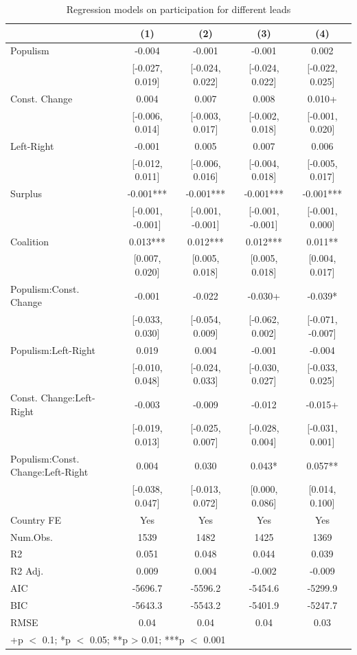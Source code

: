 \documentclass[
  abstract]{article}
\begin{document}
\hypertarget{tbl-leadpartip}{}
\begin{table}
\caption{\label{tbl-leadpartip}Regression models on participation for different leads }\tabularnewline

\centering\centering\centering
\begin{tabular}[t]{lcccc}
\toprule
  & (1) & (2) & (3) & (4)\\
\midrule
Populism & -0.004 & -0.001 & -0.001 & 0.002\\
 & {}[-0.027, 0.019] & {}[-0.024, 0.022] & {}[-0.024, 0.022] & {}[-0.022, 0.025]\\
Const. Change & 0.004 & 0.007 & 0.008 & 0.010+\\
 & {}[-0.006, 0.014] & {}[-0.003, 0.017] & {}[-0.002, 0.018] & {}[-0.001, 0.020]\\
Left-Right & -0.001 & 0.005 & 0.007 & 0.006\\
 & {}[-0.012, 0.011] & {}[-0.006, 0.016] & {}[-0.004, 0.018] & {}[-0.005, 0.017]\\
Surplus & -0.001*** & -0.001*** & -0.001*** & -0.001***\\
 & {}[-0.001, -0.001] & {}[-0.001, -0.001] & {}[-0.001, -0.001] & {}[-0.001, 0.000]\\
Coalition & 0.013*** & 0.012*** & 0.012*** & 0.011**\\
 & {}[0.007, 0.020] & {}[0.005, 0.018] & {}[0.005, 0.018] & {}[0.004, 0.017]\\
Populism:Const. Change & -0.001 & -0.022 & -0.030+ & -0.039*\\
 & {}[-0.033, 0.030] & {}[-0.054, 0.009] & {}[-0.062, 0.002] & {}[-0.071, -0.007]\\
Populism:Left-Right & 0.019 & 0.004 & -0.001 & -0.004\\
 & {}[-0.010, 0.048] & {}[-0.024, 0.033] & {}[-0.030, 0.027] & {}[-0.033, 0.025]\\
Const. Change:Left-Right & -0.003 & -0.009 & -0.012 & -0.015+\\
 & {}[-0.019, 0.013] & {}[-0.025, 0.007] & {}[-0.028, 0.004] & {}[-0.031, 0.001]\\
Populism:Const. Change:Left-Right & 0.004 & 0.030 & 0.043* & 0.057**\\
 & {}[-0.038, 0.047] & {}[-0.013, 0.072] & {}[0.000, 0.086] & {}[0.014, 0.100]\\
\midrule
Country FE & Yes & Yes & Yes & Yes\\
Num.Obs. & 1539 & 1482 & 1425 & 1369\\
R2 & 0.051 & 0.048 & 0.044 & 0.039\\
R2 Adj. & 0.009 & 0.004 & -0.002 & -0.009\\
AIC & -5696.7 & -5596.2 & -5454.6 & -5299.9\\
BIC & -5643.3 & -5543.2 & -5401.9 & -5247.7\\
RMSE & 0.04 & 0.04 & 0.04 & 0.03\\
\bottomrule
\multicolumn{5}{l}{\rule{0pt}{1em}+p $<$ 0.1; *p $<$ 0.05; **p > 0.01; ***p $<$ 0.001}\\
\end{tabular}
\end{table}
\end{document}

